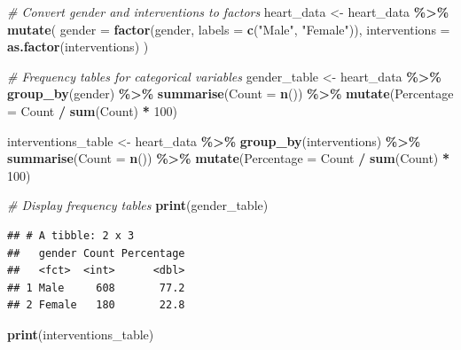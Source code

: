 \documentclass[
]{article}
\newenvironment{Shaded}{\begin{snugshade}}{\end{snugshade}}
\newcommand{\AttributeTok}[1]{\textcolor[rgb]{0.13,0.29,0.53}{#1}}
\newcommand{\CommentTok}[1]{\textcolor[rgb]{0.56,0.35,0.01}{\textit{#1}}}
\newcommand{\DecValTok}[1]{\textcolor[rgb]{0.00,0.00,0.81}{#1}}
\newcommand{\FunctionTok}[1]{\textcolor[rgb]{0.13,0.29,0.53}{\textbf{#1}}}
\newcommand{\NormalTok}[1]{#1}
\newcommand{\OtherTok}[1]{\textcolor[rgb]{0.56,0.35,0.01}{#1}}
\newcommand{\SpecialCharTok}[1]{\textcolor[rgb]{0.81,0.36,0.00}{\textbf{#1}}}
\newcommand{\StringTok}[1]{\textcolor[rgb]{0.31,0.60,0.02}{#1}}
\begin{document}
\begin{Shaded}
\begin{Highlighting}[]
\CommentTok{\# Convert gender and interventions to factors}
\NormalTok{heart\_data }\OtherTok{\textless{}{-}}\NormalTok{ heart\_data }\SpecialCharTok{\%\textgreater{}\%}
  \FunctionTok{mutate}\NormalTok{(}
    \AttributeTok{gender =} \FunctionTok{factor}\NormalTok{(gender, }\AttributeTok{labels =} \FunctionTok{c}\NormalTok{(}\StringTok{"Male"}\NormalTok{, }\StringTok{"Female"}\NormalTok{)),}
    \AttributeTok{interventions =} \FunctionTok{as.factor}\NormalTok{(interventions)}
\NormalTok{  )}

\CommentTok{\# Frequency tables for categorical variables}
\NormalTok{gender\_table }\OtherTok{\textless{}{-}}\NormalTok{ heart\_data }\SpecialCharTok{\%\textgreater{}\%}
  \FunctionTok{group\_by}\NormalTok{(gender) }\SpecialCharTok{\%\textgreater{}\%}
  \FunctionTok{summarise}\NormalTok{(}\AttributeTok{Count =} \FunctionTok{n}\NormalTok{()) }\SpecialCharTok{\%\textgreater{}\%}
  \FunctionTok{mutate}\NormalTok{(}\AttributeTok{Percentage =}\NormalTok{ Count }\SpecialCharTok{/} \FunctionTok{sum}\NormalTok{(Count) }\SpecialCharTok{*} \DecValTok{100}\NormalTok{)}

\NormalTok{interventions\_table }\OtherTok{\textless{}{-}}\NormalTok{ heart\_data }\SpecialCharTok{\%\textgreater{}\%}
  \FunctionTok{group\_by}\NormalTok{(interventions) }\SpecialCharTok{\%\textgreater{}\%}
  \FunctionTok{summarise}\NormalTok{(}\AttributeTok{Count =} \FunctionTok{n}\NormalTok{()) }\SpecialCharTok{\%\textgreater{}\%}
  \FunctionTok{mutate}\NormalTok{(}\AttributeTok{Percentage =}\NormalTok{ Count }\SpecialCharTok{/} \FunctionTok{sum}\NormalTok{(Count) }\SpecialCharTok{*} \DecValTok{100}\NormalTok{)}

\CommentTok{\# Display frequency tables}
\FunctionTok{print}\NormalTok{(gender\_table)}
\end{Highlighting}
\end{Shaded}

\begin{verbatim}
## # A tibble: 2 x 3
##   gender Count Percentage
##   <fct>  <int>      <dbl>
## 1 Male     608       77.2
## 2 Female   180       22.8
\end{verbatim}

\begin{Shaded}
\begin{Highlighting}[]
\FunctionTok{print}\NormalTok{(interventions\_table)}
\end{Highlighting}
\end{Shaded}
\end{document}
